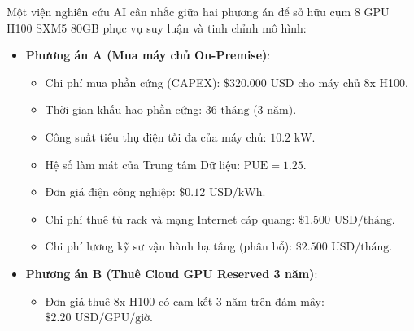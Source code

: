 \begin{example}
\label{ex:tco-comparison}
Một viện nghiên cứu AI cân nhắc giữa hai phương án để sở hữu cụm 8 GPU H100 SXM5 80GB phục vụ suy luận và tinh chỉnh mô hình:
\begin{itemize}
  \item \textbf{Phương án A (Mua máy chủ On-Premise)}:
    \begin{itemize}
      \item Chi phí mua phần cứng (CAPEX): $\$320.000\text{ USD}$ cho máy chủ 8x H100.
      \item Thời gian khấu hao phần cứng: $36\text{ tháng}$ ($3\text{ năm}$).
      \item Công suất tiêu thụ điện tối đa của máy chủ: $10.2\text{ kW}$.
      \item Hệ số làm mát của Trung tâm Dữ liệu: $\text{PUE} = 1.25$.
      \item Đơn giá điện công nghiệp: $\$0.12\text{ USD/kWh}$.
      \item Chi phí thuê tủ rack và mạng Internet cáp quang: $\$1.500\text{ USD/tháng}$.
      \item Chi phí lương kỹ sư vận hành hạ tầng (phân bổ): $\$2.500\text{ USD/tháng}$.
    \end{itemize}
  \item \textbf{Phương án B (Thuê Cloud GPU Reserved 3 năm)}:
    \begin{itemize}
      \item Đơn giá thuê 8x H100 có cam kết 3 năm trên đám mây: $\$2.20\text{ USD/GPU/giờ}$.
    \end{itemize}
\end{itemize}


\end{example}
